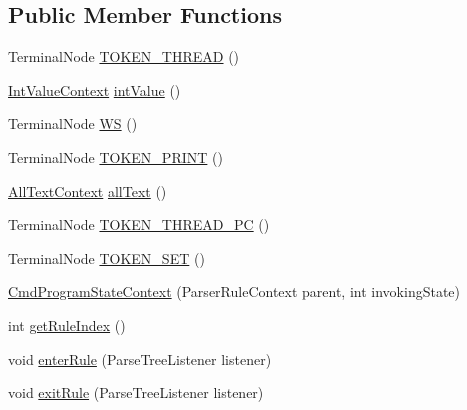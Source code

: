 \subsection*{Public Member Functions}
\begin{DoxyCompactItemize}
\item 
Terminal\+Node \hyperlink{classgov_1_1nasa_1_1jpf_1_1inspector_1_1client_1_1parser_1_1_console_grammar_parser_1_1_cmd_program_state_context_a01b4387d4c585994151dec82b22c7971}{T\+O\+K\+E\+N\+\_\+\+T\+H\+R\+E\+AD} ()
\item 
\hyperlink{classgov_1_1nasa_1_1jpf_1_1inspector_1_1client_1_1parser_1_1_console_grammar_parser_1_1_int_value_context}{Int\+Value\+Context} \hyperlink{classgov_1_1nasa_1_1jpf_1_1inspector_1_1client_1_1parser_1_1_console_grammar_parser_1_1_cmd_program_state_context_a7c919daa732082da478d64db390fa169}{int\+Value} ()
\item 
Terminal\+Node \hyperlink{classgov_1_1nasa_1_1jpf_1_1inspector_1_1client_1_1parser_1_1_console_grammar_parser_1_1_cmd_program_state_context_ac114f1d80921607ca0396e756a3b2e27}{WS} ()
\item 
Terminal\+Node \hyperlink{classgov_1_1nasa_1_1jpf_1_1inspector_1_1client_1_1parser_1_1_console_grammar_parser_1_1_cmd_program_state_context_a3f8c34d894cfb6c91ba113278a4b1cea}{T\+O\+K\+E\+N\+\_\+\+P\+R\+I\+NT} ()
\item 
\hyperlink{classgov_1_1nasa_1_1jpf_1_1inspector_1_1client_1_1parser_1_1_console_grammar_parser_1_1_all_text_context}{All\+Text\+Context} \hyperlink{classgov_1_1nasa_1_1jpf_1_1inspector_1_1client_1_1parser_1_1_console_grammar_parser_1_1_cmd_program_state_context_a55eebea452c04a07be64daa4d15fc201}{all\+Text} ()
\item 
Terminal\+Node \hyperlink{classgov_1_1nasa_1_1jpf_1_1inspector_1_1client_1_1parser_1_1_console_grammar_parser_1_1_cmd_program_state_context_ad62b29a9cdcf6b5b466410e908c53757}{T\+O\+K\+E\+N\+\_\+\+T\+H\+R\+E\+A\+D\+\_\+\+PC} ()
\item 
Terminal\+Node \hyperlink{classgov_1_1nasa_1_1jpf_1_1inspector_1_1client_1_1parser_1_1_console_grammar_parser_1_1_cmd_program_state_context_a5e645b1f83b66bad4d68ca5b352eda8b}{T\+O\+K\+E\+N\+\_\+\+S\+ET} ()
\item 
\hyperlink{classgov_1_1nasa_1_1jpf_1_1inspector_1_1client_1_1parser_1_1_console_grammar_parser_1_1_cmd_program_state_context_a70af6f601a32845257851ba653e3f92f}{Cmd\+Program\+State\+Context} (Parser\+Rule\+Context parent, int invoking\+State)
\item 
int \hyperlink{classgov_1_1nasa_1_1jpf_1_1inspector_1_1client_1_1parser_1_1_console_grammar_parser_1_1_cmd_program_state_context_aed96508f0770a13ca3e1554f19bb9304}{get\+Rule\+Index} ()
\item 
void \hyperlink{classgov_1_1nasa_1_1jpf_1_1inspector_1_1client_1_1parser_1_1_console_grammar_parser_1_1_cmd_program_state_context_a873b903759a6152fd66fc43c1792323d}{enter\+Rule} (Parse\+Tree\+Listener listener)
\item 
void \hyperlink{classgov_1_1nasa_1_1jpf_1_1inspector_1_1client_1_1parser_1_1_console_grammar_parser_1_1_cmd_program_state_context_a1a6d65b0e28bc5fc42a54c4cda837e75}{exit\+Rule} (Parse\+Tree\+Listener listener)
\end{DoxyCompactItemize}
